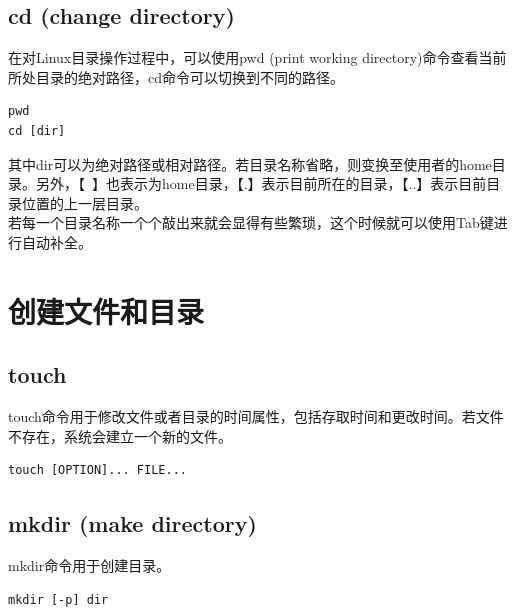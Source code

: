 \documentclass[12pt, openany, oneside]{book}
\begin{document}
\subsection{cd (change directory)}

在对Linux目录操作过程中，可以使用pwd (print working directory)命令查看当前所处目录的绝对路径，cd命令可以切换到不同的路径。

\vspace{-0.5cm}
\begin{lstlisting}
pwd
cd [dir]
\end{lstlisting}

其中dir可以为绝对路径或相对路径。若目录名称省略，则变换至使用者的home目录。另外，【~】也表示为home目录，【.】表示目前所在的目录，【..】表示目前目录位置的上一层目录。 \\

若每一个目录名称一个个敲出来就会显得有些繁琐，这个时候就可以使用Tab键进行自动补全。

\newpage

\section{创建文件和目录}

\subsection{touch}

touch命令用于修改文件或者目录的时间属性，包括存取时间和更改时间。若文件不存在，系统会建立一个新的文件。

\vspace{-0.5cm}
\begin{lstlisting}
touch [OPTION]... FILE...
\end{lstlisting}

\subsection{mkdir (make directory)}

mkdir命令用于创建目录。

\vspace{-0.5cm}
\begin{lstlisting}
mkdir [-p] dir
\end{lstlisting}

\begin{table}[H]
	\centering
	\caption{mkdir参数说明}
\end{table}
\end{document}
